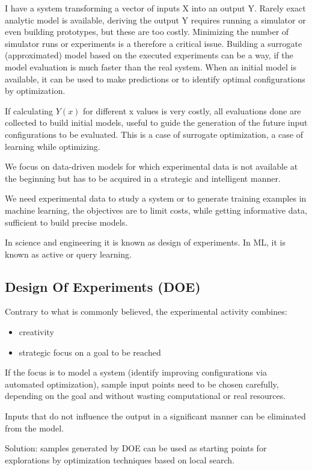 \documentclass[10pt]{article}
\begin{document}
I have a system transforming a vector of inputs X into an output Y.
Rarely exact analytic model is available, deriving the output Y requires running a simulator or even building prototypes, but these are too costly.
Minimizing the number of simulator runs or experiments is a therefore a critical issue. Building a surrogate (approximated) model based on the executed experiments can be a way, if the model evaluation is much faster than the real system. When an initial model is available, it can be used to make predictions or to identify optimal configurations by optimization.

If calculating $ Y(x) $ for different x values is very costly, all evaluations done are collected to build initial models, useful to guide the generation of the future input configurations to be evaluated.
This is a case of surrogate optimization, a case of learning while optimizing.

We focus on data-driven models for which experimental data is not available at the beginning but has to be acquired in a strategic and intelligent manner. 

We need experimental data to study a system or to generate training examples in machine learning, the objectives are to limit costs, while getting informative data, sufficient to build precise models.

In science and engineering it is known as design of experiments. In
ML, it is known as active or query learning.

\subsection{Design Of Experiments (DOE)}

Contrary to what is commonly believed, the experimental activity combines:
\begin{itemize}
\item creativity 
\item strategic focus on a goal to be reached 
\end{itemize}

If the focus is to model a system (identify improving configurations via automated optimization), sample input points need to be chosen carefully, depending on the goal and without wasting computational or real resources.

Inputs that do not influence the output in a significant manner can be eliminated from the model.

Solution: samples generated by DOE can be used as starting points for explorations by optimization techniques based on local search.
\end{document}
